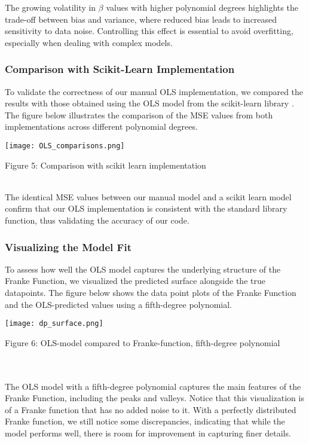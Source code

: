 \documentclass{article}
\begin{document}
\begin{enumerate}
The growing volatility in $\beta$ values with higher polynomial degrees highlights the trade-off between bias and variance, where reduced bias leads to increased sensitivity to data noise. Controlling this effect is essential to avoid overfitting, especially when dealing with complex models.


\subsubsection{Comparison with Scikit-Learn Implementation}

To validate the correctness of our manual OLS implementation, we compared the results with those obtained using the OLS model from the scikit-learn library \cite{scikit-learn}. The figure below illustrates the comparison of the MSE values from both implementations across different polynomial degrees.


\texttt{[image: OLS\_comparisons.png]} 
\caption{Figure 5: Comparison with \cite{scikit-learn} scikit learn implementation}
\label{fig} \\


The identical MSE values between our manual model and a scikit learn model confirm that our OLS implementation is consistent with the standard library function, thus validating the accuracy of our code.

\subsubsection{Visualizing the Model Fit}

To assess how well the OLS model captures the underlying structure of the Franke Function, we visualized the predicted surface alongside the true datapoints. The figure below shows the data point plots of the Franke Function and the OLS-predicted values using a fifth-degree polynomial.

    \texttt{[image: dp\_surface.png]}
    \caption{Figure 6: OLS-model compared to Franke-function, fifth-degree polynomial}
    \label{fig:enter-label}\\\\


The OLS model with a fifth-degree polynomial captures the main features of the Franke Function, including the peaks and valleys. Notice that this visualization is of a Franke function that has no added noise to it. With a perfectly distributed Franke function, we still notice some discrepancies, indicating that while the model performs well, there is room for improvement in capturing finer details.



\end{enumerate}
\end{document}
